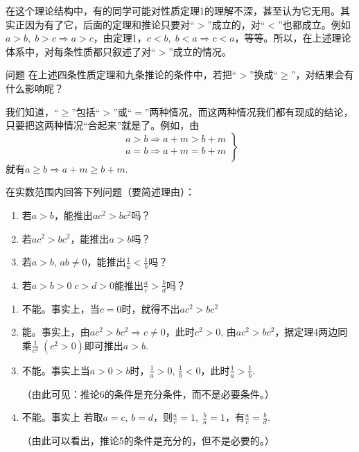  在这个理论结构中，有的同学可能对性质定理1的理解不深，甚至认为它无用。其实正因为有了它，后面的定理和推论只要对“$>$”成立的，对“$<$”也都成立。例如$a>b,\; b>c\Longrightarrow a>c$，由定理1，$c<b,\; b<a\Longrightarrow c<a$，等等。所以，在上述理论体系中，对每条性质都只叙述了对“$>$”成立的情况。

 \begin{thm}{问题}
 在上述四条性质定理和九条推论的条件中，若把“$>$”换成“$\ge $”，对结果会有什么影响呢？
 \end{thm}

 我们知道，“$\ge $”包括“$>$”或“$=$”两种情况，而这两种情况我们都有现成的结论，只要把这两种情况“合起来”就是了。例如，由
\[\left.\begin{array}{cc}
    a>b\Longrightarrow a+m>b+m\\
    a=b\Longrightarrow a+m=b+m\\
\end{array}\right\}\]
就有$a\ge b\Longrightarrow a+m\ge b+m$.

\begin{example}
在实数范围内回答下列问题（要简述理由）：
\begin{enumerate}[(1)]
\item 若$a>b$，能推出$ac^2>bc^2$吗？
\item 若$ac^2>bc^2$，能推出$a>b$吗？
\item 若$a>b$, $ab\ne 0$，能推出$\frac{1}{a}<\frac{1}{b}$吗？
\item 若$a>b>0\; c>d>0$能推出$\frac{a}{c}>\frac{b}{d}$吗？
\end{enumerate}
\end{example}

\begin{solution}
\begin{enumerate}[(1)]
\item 不能。事实上，当$c=0$时，就得不出$ac^2>bc^2$
\item 能。事实上，由$ac^2>bc^2\Longrightarrow c\ne 0$，此时$c^2>0$, 由$ac^2>bc^2$，据定理4两边同乘$\frac{1}{c^2}\; (c^2>0)$即可推出$a>b$.
\item 不能。事实上当$a>0>b$时，$\frac{1}{a}>0$, $\frac{1}{b}<0$，此时$\frac{1}{a}>\frac{1}{b}$.

（由此可见：推论6的条件是充分条件，而不是必要条件。）
\item 不能。事实上
若取$a=c$, $b=d$，则$\frac{a}{c}=1,\; \frac{b}{a}=1$，有$\frac{a}{c}=\frac{b}{d}$.

（由此可以看出，推论5的条件是充分的，但不是必要的。）
\end{enumerate}
\end{solution}

